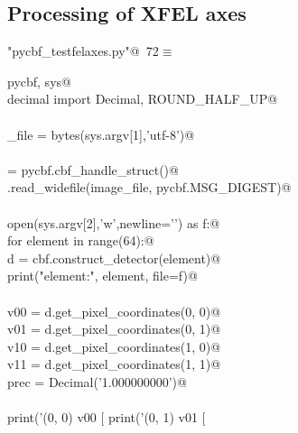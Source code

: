 \documentclass[10pt,a4paper,twoside,notitlepage]{article}
\begin{document}
\subsection{Processing of XFEL axes}

\begin{flushleft} \small
\begin{minipage}{\linewidth}\label{scrap17}\raggedright\small
{} \verb@"pycbf_testfelaxes.py"@\nobreak\ {\footnotesize {72}}$\equiv$
\vspace{-1ex}
\begin{list}{}{} \item
\mbox{}\verb@import pycbf, sys@\\
\mbox{}\verb@from decimal import Decimal, ROUND_HALF_UP@\\
\mbox{}\verb@@\\
\mbox{}\verb@image_file = bytes(sys.argv[1],'utf-8')@\\
\mbox{}\verb@@\\
\mbox{}\verb@cbf = pycbf.cbf_handle_struct()@\\
\mbox{}\verb@cbf.read_widefile(image_file, pycbf.MSG_DIGEST)@\\
\mbox{}\verb@@\\
\mbox{}\verb@with open(sys.argv[2],'w',newline='\n') as f:@\\
\mbox{}\verb@    for element in range(64):@\\
\mbox{}\verb@        d = cbf.construct_detector(element)@\\
\mbox{}\verb@        print("element:", element, file=f)@\\
\mbox{}\verb@@\\
\mbox{}\verb@        v00 = d.get_pixel_coordinates(0, 0)@\\
\mbox{}\verb@        v01 = d.get_pixel_coordinates(0, 1)@\\
\mbox{}\verb@        v10 = d.get_pixel_coordinates(1, 0)@\\
\mbox{}\verb@        v11 = d.get_pixel_coordinates(1, 1)@\\
\mbox{}\verb@        prec = Decimal('1.000000000')@\\
\mbox{}\verb@@\\
\mbox{}\verb@        print('(0, 0) v00 [ %.9f %.9f %.9f ]' %(round(v00[0],9), round(v00[1],9), round(v00[2],9)), file=f)@\\
\mbox{}\verb@        print('(0, 1) v01 [ %.9g %.9g %.9g ]' %(round(v01[0],9), round(v01[1],9), round(v01[2],9)), file=f)@\\

\end{list}
\end{minipage}
\end{flushleft}
\end{document}
